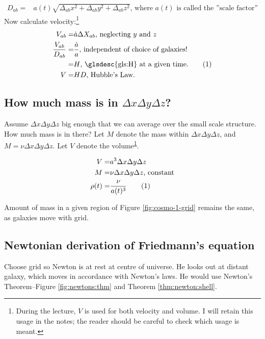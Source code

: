 \documentclass[]{article}
\newcommand\numberthis{\addtocounter{equation}{1}\tag{\theequation}}
\begin{document}
 \begin{align*}            
 	D_{ab}=&a(t) \sqrt{\Delta_{ab} x^2 + \Delta_{ab} y^2 + \Delta_{ab} z^2}  \text{, where $a(t)$ is called the ''scale factor''}
\end{align*}
 Now calculate velocity:\footnote{\label{note1}During the lecture, $V$ is used for both velocity and volume. I will retain this usage in the notes; the reader should be careful to check which usage is meant.}           
 \begin{align*}	
 	V_{ab}=&\dot{a} \Delta X_{ab} \text{, neglecting $y$ and $z$}\\
 	\frac{V_{ab}}{D_{ab}} =& \frac{\dot{a}}{a} \text{, independent of choice of galaxies!}\\
 	=& H \text{, \glsdesc{gls:H} at a given time.} \numberthis \label{eq:hubble}\\
 	V =& H D \text{, Hubble's Law.}
\end{align*}
 
\subsection{How much mass is in $\Delta x \Delta y \Delta z$?}

Assume  $\Delta x \Delta y \Delta z$ big enough that we can average over the small scale structure. How much mass is in there? Let $M$ denote the mass within $\Delta x \Delta y \Delta z$, and $M = \nu \Delta x \Delta y \Delta z$. Let $V$ denote the volume\textsuperscript{\ref{note1}}.

\begin{align*}
	V =& a^3 \Delta x \Delta y \Delta z\\
	M =& \nu \Delta x \Delta y \Delta z \text{, constant}\\
	\rho(t) =& \frac{\nu}{a(t)^3} \numberthis \label{eq:rho}
\end{align*}

Amount of mass in a given region of Figure \ref{fig:cosmo-1-grid} remains the same, as galaxies move with grid.

\subsection{Newtonian derivation of Friedmann's equation}
Choose grid so Newton is at rest at centre of universe. He looks out at distant galaxy, which moves in accordance with Newton's laws. He would use Newton's Theorem--Figure \ref{fig:newtons:thm} and Theorem \ref{thm:newton:shell}.
\end{document}
